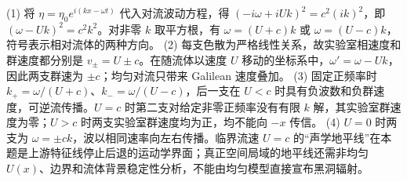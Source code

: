 (1) 将 \(\eta=\eta_0e^{i(kx-\omega t)}\) 代入对流波动方程，得 \((-i\omega+iUk)^2=c^2(ik)^2\)，即 \((\omega-Uk)^2=c^2k^2\)。对非零 \(k\) 取平方根，有 \(\omega=(U+c)k\) 或 \(\omega=(U-c)k\)，符号表示相对流体的两种方向。
(2) 每支色散为严格线性关系，故实验室相速度和群速度都分别是 \(v_\pm=U\pm c\)。在随流体以速度 \(U\) 移动的坐标系中，\(\omega'=\omega-Uk\)，因此两支群速为 \(\pm c\)；均匀对流只带来 Galilean 速度叠加。
(3) 固定正频率时 \(k_+=\omega/(U+c)\)、\(k_-=\omega/(U-c)\)，后一支在 \(U<c\) 时具有负波数和负群速度，可逆流传播。\(U=c\) 时第二支对给定非零正频率没有有限 \(k\) 解，其实验室群速度为零；\(U>c\) 时两支实验室群速度均为正，均不能向 \(-x\) 传信。
(4) \(U=0\) 时两支为 \(\omega=\pm ck\)，波以相同速率向左右传播。临界流速 \(U=c\) 的“声学地平线”在本题是上游特征线停止后退的运动学界面；真正空间局域的地平线还需非均匀 \(U(x)\)、边界和流体背景稳定性分析，不能由均匀模型直接宣布黑洞辐射。

